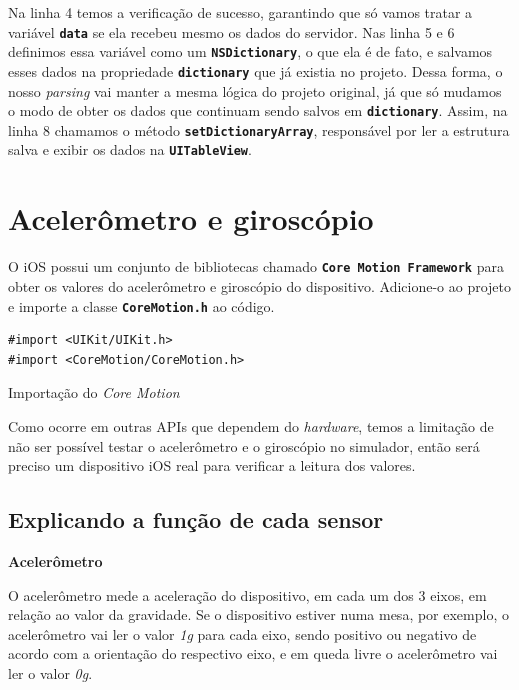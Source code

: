 \documentclass[a4paper,12pt,brazil,doubleside]{book}
\begin{document}
\begin{singlespace}
Na linha 4 temos a verificação de sucesso, garantindo que só vamos tratar a variável \texttt{\textbf{data}} se ela recebeu mesmo os dados do servidor. Nas linha 5 e 6 definimos essa variável como um \texttt{\textbf{NSDictionary}}, o que ela é de fato, e salvamos esses dados na propriedade \texttt{\textbf{dictionary}} que já existia no projeto. Dessa forma, o nosso \emph{parsing} vai manter a mesma lógica do projeto original, já que só mudamos o modo de obter os dados que continuam sendo salvos em \texttt{\textbf{dictionary}}. Assim, na linha 8 chamamos o método \texttt{\textbf{setDictionaryArray}}, responsável por ler a estrutura salva e exibir os dados na \texttt{\textbf{UITableView}}.

\section{Acelerômetro e giroscópio}


O iOS possui um conjunto de bibliotecas chamado \texttt{\textbf{Core Motion Framework}} para obter os valores do acelerômetro e giroscópio do dispositivo. Adicione-o ao projeto e importe a classe \texttt{\textbf{CoreMotion.h}} ao código.

\begin{listing}[H]
\begin{verbatim}
#import <UIKit/UIKit.h>
#import <CoreMotion/CoreMotion.h>
\end{verbatim}
\caption{Importação do \emph{Core Motion}}
\end{listing}


Como ocorre em outras APIs que dependem do \emph{hardware}, temos a limitação de não ser possível testar o acelerômetro e o giroscópio no simulador, então será preciso um dispositivo iOS real para verificar a leitura dos valores.

\subsection{Explicando a função de cada sensor}


\textbf{Acelerômetro}


O acelerômetro mede a aceleração do dispositivo, em cada um dos 3 eixos, em relação ao valor da gravidade. Se o dispositivo estiver numa mesa, por exemplo, o acelerômetro vai ler o valor \emph{1g} para cada eixo, sendo positivo ou negativo de acordo com a orientação do respectivo eixo, e em queda livre o acelerômetro vai ler o valor \emph{0g}.


\end{singlespace}
\end{document}
